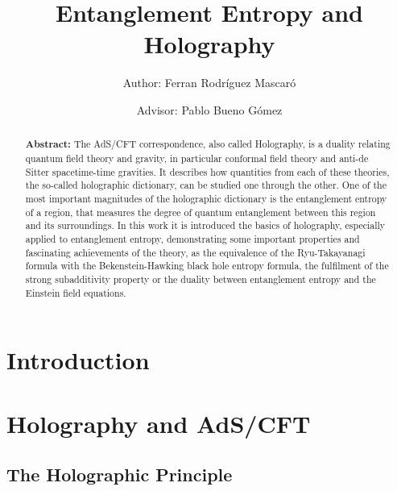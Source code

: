 \documentclass[twocolumn]{revtex4}
\begin{document}
\pagestyle{fancy}


\title{Entanglement Entropy and Holography}
\author{Author: Ferran Rodríguez Mascaró}
\author{Advisor: Pablo Bueno Gómez}


\begin{abstract}
    {\bf Abstract:} The AdS/CFT correspondence, also called Holography, is a duality relating quantum field theory and gravity, in particular conformal field theory and anti-de Sitter spacetime-time gravities. It describes how quantities from each of these theories, the so-called holographic dictionary, can be studied one through the other. One of the most important magnitudes of the holographic dictionary is the entanglement entropy of a region, that measures the degree of quantum entanglement between this region and its surroundings. In this work it is introduced the basics of holography, especially applied to entanglement entropy, demonstrating some important properties and fascinating achievements of the theory, as the equivalence of the Ryu-Takayanagi formula with the Bekenstein-Hawking black hole entropy formula, the fulfilment of the strong subadditivity property or the duality between entanglement entropy and the Einstein field equations.
\end{abstract}


\maketitle


\section{Introduction} \label{s:Intro}






\newpage


\section{Holography and AdS/CFT}


\subsection{The Holographic Principle} \label{ss:Holography}
\end{document}
